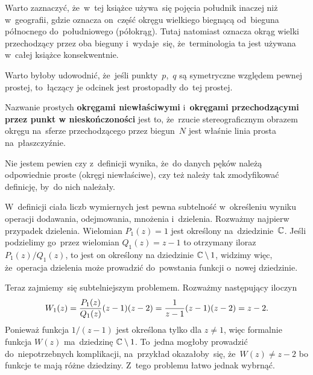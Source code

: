 \documentclass[a4paper,11pt]{article}
\begin{document}
\vspace{\spaceFour}


\start {} Warto zaznaczyć, że~w~tej książce używa~się pojęcia
południk inaczej niż w~geografii, gdzie oznacza on~część okręgu
wielkiego biegnącą od~bieguna północnego do~południowego (półokrąg).
Tutaj natomiast oznacza okrąg wielki przechodzący przez oba bieguny
i~wydaje~się, że~terminologia ta jest używana w~całej książce
konsekwentnie.

\vspace{\spaceFour}


\start {} Warto byłoby udowodnić, że~jeśli punkty~$p$,~$q$ są
symetryczne względem pewnej prostej, to~łączący je odcinek jest
prostopadły do~tej prostej.

\vspace{\spaceFour}


\start {} Nazwanie prostych \textbf{okręgami niewłaściwymi}
i~\textbf{okręgami przechodzącymi przez punkt w nieskończoności} jest
to, że~rzucie stereograficznym obrazem okręgu na~sferze przechodzącego
przez biegun~$N$ jest właśnie linia prosta na~płaszczyźnie.

\vspace{\spaceFour}


\start {} Nie jestem pewien czy z~definicji wynika, że~do danych
pęków należą odpowiednie proste (okręgi niewłaściwe), czy też należy
tak zmodyfikować definicję, by~do nich należały.

\vspace{\spaceFour}


\start {} W~definicji ciała liczb wymiernych jest pewna
subtelność w~określeniu wyniku operacji dodawania, odejmowania,
mnożenia i~dzielenia. Rozważmy najpierw przypadek dzielenia. Wielomian
$P_{ 1 }( z ) = 1$ jest określony na~dziedzinie~$\mathbb{C}$. Jeśli podzielimy
go~przez wielomian $Q_{ 1 }( z ) = z - 1$ to otrzymany iloraz
$P_{ 1 }( z ) / Q_{ 1 }( z )$, to jest on określony na dziedzinie
$\mathbb{C} \setminus 1$, widzimy więc, że~operacja dzielenia może prowadzić
do~powstania funkcji o~nowej dziedzinie.

Teraz zajmiemy~się subtelniejszym problemem. Rozważmy następujący
iloczyn
\begin{equation}
  \label{eq:Leja-35}
  \begin{split}
    W_{ 1 }( z ) = \frac{ P_{ 1 }( z ) }{ Q_{ 1 }( z ) } ( z - 1 ) ( z -
    2 ) = \frac{ 1 }{ z - 1 } ( z - 1 ) ( z - 2 ) = z - 2.
  \end{split}
\end{equation}
Ponieważ funkcja $1 / ( z - 1 )$ jest określona tylko dla $z \neq 1$,
więc formalnie funkcja $W( z )$ ma~dziedzinę $\mathbb{C} \setminus 1$.
To~jedna mogłoby prowadzić do~niepotrzebnych komplikacji, na~przykład
okazałoby~się, że~$W( z ) \neq z - 2$ bo funkcje te mają różne
dziedziny. Z~tego problemu łatwo jednak wybrnąć.
\end{document}
